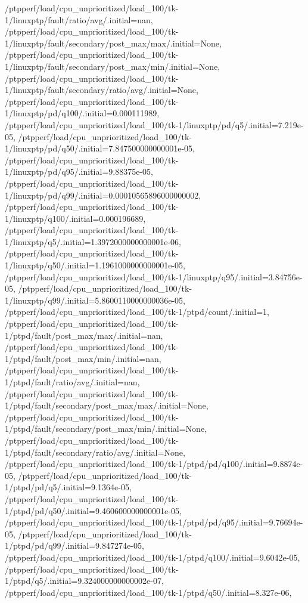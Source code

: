 {    /ptpperf/load/cpu_unprioritized/load_100/tk-1/linuxptp/fault/ratio/avg/.initial=nan,
    /ptpperf/load/cpu_unprioritized/load_100/tk-1/linuxptp/fault/secondary/post_max/max/.initial=None,
    /ptpperf/load/cpu_unprioritized/load_100/tk-1/linuxptp/fault/secondary/post_max/min/.initial=None,
    /ptpperf/load/cpu_unprioritized/load_100/tk-1/linuxptp/fault/secondary/ratio/avg/.initial=None,
    /ptpperf/load/cpu_unprioritized/load_100/tk-1/linuxptp/pd/q100/.initial=0.000111989,
    /ptpperf/load/cpu_unprioritized/load_100/tk-1/linuxptp/pd/q5/.initial=7.219e-05,
    /ptpperf/load/cpu_unprioritized/load_100/tk-1/linuxptp/pd/q50/.initial=7.847500000000001e-05,
    /ptpperf/load/cpu_unprioritized/load_100/tk-1/linuxptp/pd/q95/.initial=9.88375e-05,
    /ptpperf/load/cpu_unprioritized/load_100/tk-1/linuxptp/pd/q99/.initial=0.00010565896000000002,
    /ptpperf/load/cpu_unprioritized/load_100/tk-1/linuxptp/q100/.initial=0.000196689,
    /ptpperf/load/cpu_unprioritized/load_100/tk-1/linuxptp/q5/.initial=1.3972000000000001e-06,
    /ptpperf/load/cpu_unprioritized/load_100/tk-1/linuxptp/q50/.initial=1.1961000000000001e-05,
    /ptpperf/load/cpu_unprioritized/load_100/tk-1/linuxptp/q95/.initial=3.84756e-05,
    /ptpperf/load/cpu_unprioritized/load_100/tk-1/linuxptp/q99/.initial=5.8600110000000036e-05,
    /ptpperf/load/cpu_unprioritized/load_100/tk-1/ptpd/count/.initial=1,
    /ptpperf/load/cpu_unprioritized/load_100/tk-1/ptpd/fault/post_max/max/.initial=nan,
    /ptpperf/load/cpu_unprioritized/load_100/tk-1/ptpd/fault/post_max/min/.initial=nan,
    /ptpperf/load/cpu_unprioritized/load_100/tk-1/ptpd/fault/ratio/avg/.initial=nan,
    /ptpperf/load/cpu_unprioritized/load_100/tk-1/ptpd/fault/secondary/post_max/max/.initial=None,
    /ptpperf/load/cpu_unprioritized/load_100/tk-1/ptpd/fault/secondary/post_max/min/.initial=None,
    /ptpperf/load/cpu_unprioritized/load_100/tk-1/ptpd/fault/secondary/ratio/avg/.initial=None,
    /ptpperf/load/cpu_unprioritized/load_100/tk-1/ptpd/pd/q100/.initial=9.8874e-05,
    /ptpperf/load/cpu_unprioritized/load_100/tk-1/ptpd/pd/q5/.initial=9.1364e-05,
    /ptpperf/load/cpu_unprioritized/load_100/tk-1/ptpd/pd/q50/.initial=9.460600000000001e-05,
    /ptpperf/load/cpu_unprioritized/load_100/tk-1/ptpd/pd/q95/.initial=9.76694e-05,
    /ptpperf/load/cpu_unprioritized/load_100/tk-1/ptpd/pd/q99/.initial=9.847274e-05,
    /ptpperf/load/cpu_unprioritized/load_100/tk-1/ptpd/q100/.initial=9.6042e-05,
    /ptpperf/load/cpu_unprioritized/load_100/tk-1/ptpd/q5/.initial=9.324000000000002e-07,
    /ptpperf/load/cpu_unprioritized/load_100/tk-1/ptpd/q50/.initial=8.327e-06,
}
